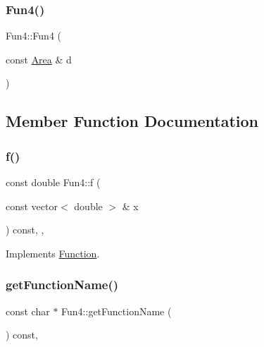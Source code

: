 \mbox{\label{class_fun4_a604acbf431d2ac044090349ef5f6d174}} 
\subsubsection{\texorpdfstring{Fun4()}{Fun4()}\hspace{0.1cm}{\footnotesize\ttfamily [2/2]}}
{\footnotesize\ttfamily Fun4\+::\+Fun4 (\begin{DoxyParamCaption}\item[{const \hyperlink{class_area}{Area} \&}]{d }\end{DoxyParamCaption})}



\subsection{Member Function Documentation}
\mbox{\label{class_fun4_a6d02fcaf80b0baa15b2828afb19dee12}} 
\subsubsection{\texorpdfstring{f()}{f()}}
{\footnotesize\ttfamily const double Fun4\+::f (\begin{DoxyParamCaption}\item[{const vector$<$ double $>$ \&}]{x }\end{DoxyParamCaption}) const\hspace{0.3cm}{\ttfamily [inline]}, {\ttfamily [override]}, {\ttfamily [virtual]}}



Implements \hyperlink{class_function_a81ec299f137e34109246cde88d88c949}{Function}.

\mbox{\label{class_fun4_a7d4a9da6240876674244784c79184772}} 
\subsubsection{\texorpdfstring{get\+Function\+Name()}{getFunctionName()}}
{\footnotesize\ttfamily const char $\ast$ Fun4\+::get\+Function\+Name (\begin{DoxyParamCaption}{ }\end{DoxyParamCaption}) const\hspace{0.3cm}{\ttfamily [override]}, {\ttfamily [virtual]}}



